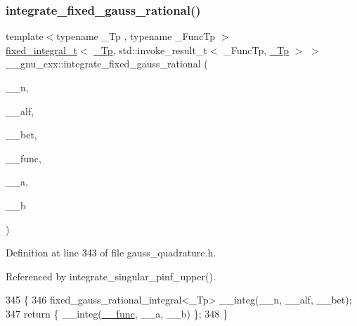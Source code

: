 \subsubsection{\texorpdfstring{integrate\+\_\+fixed\+\_\+gauss\+\_\+rational()}{integrate\_fixed\_gauss\_rational()}}
{\footnotesize\ttfamily template$<$typename \+\_\+\+Tp , typename \+\_\+\+Func\+Tp $>$ \\
\hyperlink{struct____gnu__cxx_1_1fixed__integral__t}{fixed\+\_\+integral\+\_\+t}$<$ \hyperlink{namespace____gnu__cxx_a3b19a9c800ca194374ef9172290f7d79}{\+\_\+\+Tp}, std\+::invoke\+\_\+result\+\_\+t$<$ \+\_\+\+Func\+Tp, \hyperlink{namespace____gnu__cxx_a3b19a9c800ca194374ef9172290f7d79}{\+\_\+\+Tp} $>$ $>$ \+\_\+\+\_\+gnu\+\_\+cxx\+::integrate\+\_\+fixed\+\_\+gauss\+\_\+rational (\begin{DoxyParamCaption}\item[{int}]{\+\_\+\+\_\+n,  }\item[{\hyperlink{namespace____gnu__cxx_a3b19a9c800ca194374ef9172290f7d79}{\+\_\+\+Tp}}]{\+\_\+\+\_\+alf,  }\item[{\hyperlink{namespace____gnu__cxx_a3b19a9c800ca194374ef9172290f7d79}{\+\_\+\+Tp}}]{\+\_\+\+\_\+bet,  }\item[{\+\_\+\+Func\+Tp}]{\+\_\+\+\_\+func,  }\item[{\hyperlink{namespace____gnu__cxx_a3b19a9c800ca194374ef9172290f7d79}{\+\_\+\+Tp}}]{\+\_\+\+\_\+a,  }\item[{\hyperlink{namespace____gnu__cxx_a3b19a9c800ca194374ef9172290f7d79}{\+\_\+\+Tp}}]{\+\_\+\+\_\+b }\end{DoxyParamCaption})}



Definition at line 343 of file gauss\+\_\+quadrature.\+h.



Referenced by integrate\+\_\+singular\+\_\+pinf\+\_\+upper().


\begin{DoxyCode}
345     \{
346       fixed\_gauss\_rational\_integral<\_Tp> \_\_integ(\_\_n, \_\_alf, \_\_bet);
347       \textcolor{keywordflow}{return} \{ \_\_integ(\hyperlink{namespace____gnu__cxx_af2b2f0c7a2ae72b922b1afefae5a65b2}{\_\_func}, \_\_a, \_\_b) \};
348     \}
\end{DoxyCode}
\mbox{\label{namespace____gnu__cxx_aaf3bee7e1617cc1ef517b155e8b14e87}} 
